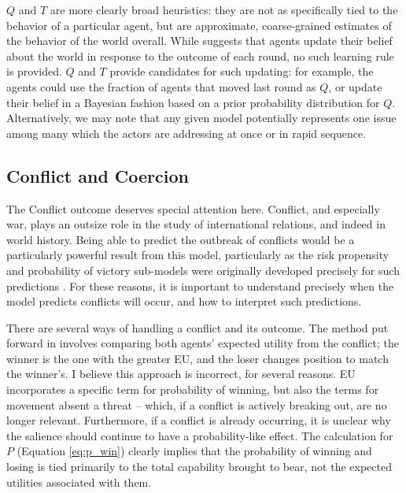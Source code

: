 $Q$ and $T$ are more clearly broad heuristics: they are not as specifically tied to the behavior of a particular agent, but are approximate, coarse-grained estimates of the behavior of the world overall. While \citet{bdm_2002} suggests that agents update their belief about the world in response to the outcome of each round, no such learning rule is provided. $Q$ and $T$ provide candidates for such updating: for example, the agents could use the fraction of agents that moved last round as $Q$, or update their belief in a Bayesian fashion based on a prior probability distribution for $Q$. Alternatively, we may note that any given model potentially represents one issue among many which the actors are addressing at once or in rapid sequence.

\subsection{Conflict and Coercion} \label{conflict_coercion}

The Conflict outcome deserves special attention here. Conflict, and especially war, plays an outsize role in the study of international relations, and indeed in world history. Being able to predict the outbreak of conflicts would be a particularly powerful result from this model, particularly as the risk propensity and probability of victory sub-models were originally developed precisely for such predictions \citep{bdm_1985}. For these reasons, it is important to understand precisely when the model predicts conflicts will occur, and how to interpret such predictions.

There are several ways of handling a conflict and its outcome. The method put forward in \citet{scholz_2011} involves comparing both agents' expected utility from the conflict; the winner is the one with the greater EU, and the loser changes position to match the winner's. I believe this approach is incorrect, for several reasons. EU incorporates a specific term for probability of winning, but also the terms for movement absent a threat -- which, if a conflict is actively breaking out, are no longer relevant. Furthermore, if a conflict is already occurring, it is unclear why the salience should continue to have a probability-like effect. The calculation for $P$ (Equation \ref{eq:p_win}) clearly implies that the probability of winning and losing is tied primarily to the total capability brought to bear, not the expected utilities associated with them.

